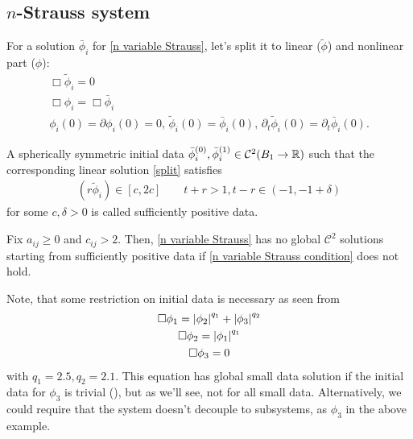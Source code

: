 \documentclass[11pt, oneside]{amsart}
\begin{document}
	
	\subsection{$n$-Strauss system}\label{strauss section}
	For a solution $\bar{\phi}_i$ for \eqref{n variable Strauss}, let's split it to linear ($\tilde{\phi}$) and nonlinear part ($\phi$):
	\begin{equation}\label{split}
		\begin{gathered}
			\Box\tilde{\phi}_i=0\\
			\Box\phi_i=\Box\bar{\phi}_i\\
			\phi_i(0)=\partial\phi_i(0)=0,\,\tilde{\phi}_i(0)=\bar{\phi}_i(0),\,\partial_t\tilde{\phi}_i(0)=\partial_t\bar{\phi}_i(0).
		\end{gathered}
	\end{equation}
	
	
	\begin{definition}\label{sufficiently positive data}
		A spherically symmetric initial data $\bar{\phi}_i^{(0)},\bar{\phi}_i^{(1)}\in\mathcal{C}^2(B_1\to\mathbb{R})$ such that the corresponding linear solution \eqref{split} satisfies
		\begin{equation*}
			\begin{gathered}
				(r\tilde{\phi}_i)\in[c,2c] \qquad t+r>1,t-r\in(-1,-1+\delta)
			\end{gathered}
		\end{equation*}
		for some $c,\delta>0$ is called sufficiently positive data.
	\end{definition}
	
	\begin{theorem} Fix $a_{ij}\geq 0$ and $c_{ij}>2$. Then, \label{blow up for n strauss theorem}
		\cref{n variable Strauss} has no global $\mathcal{C}^2$ solutions starting from sufficiently positive data if \cref{n variable Strauss condition} does not hold.
	\end{theorem}
	\begin{remark}
		Note, that some restriction on initial data is necessary as seen from
		\begin{equation*}
			\begin{gathered}
				\Box\phi_1=\left\lvert \phi_2\right\rvert^{q_1}+\left\lvert \phi_3\right\rvert^{q_2}\\
				\Box\phi_2=\left\lvert \phi_1\right\rvert^{q_1}\\
				\Box\phi_3=0
			\end{gathered}
		\end{equation*}
		with $q_1=2.5,q_2=2.1$. This equation has global small data solution if the initial data for $\phi_3$ is trivial (\cite{del_santo_global_1997}), but as we'll see, not for all small data. Alternatively, we could require that the system doesn't decouple to subsystems, as $\phi_3$ in the above example.
	\end{remark}
		
\end{document}
